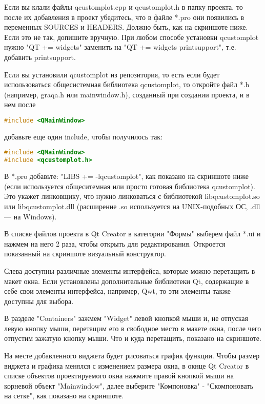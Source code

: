 Если вы клали файлы qcustomplot.cpp и qcustomplot.h в папку проекта, то после их добавления в проект убедитесь, что в файле *.pro они появились в переменных SOURCES и HEADERS. Должно быть, как на скриншоте ниже. Если это не так, допишите вручную. При любом способе установки qcustomplot нужно "QT += widgets" заменить на "QT += widgets printsupport", т.е. добавить printsupport.

Если вы установили qcustomplot из репозитория, то есть если будет использоваться общесистемная библиотека qcustomplot, то откройте файл *.h (например, graqa.h или mainwindow.h), созданный при создании проекта, и в нем после
\begin{lstlisting}[language=c++]
#include <QMainWindow>
\end{lstlisting}
добавьте еще один include, чтобы получилось так:
\begin{lstlisting}[language=c++]
#include <QMainWindow>
#include <qcustomplot.h>
\end{lstlisting}
В *.pro добавьте: "LIBS += -lqcustomplot", как показано на скриншоте ниже (если используется общеситемная или просто готовая библиотека qcustomplot). Это укажет линковщику, что нужно линковаться с библиотекой libqcustomplot.so или libqcustomplot.dll (расширение .so используется на UNIX-подобных ОС, .dll — на Windows).

В списке файлов проекта в Qt Creator в категории "Формы" выберем файл *.ui и нажмем на него 2 раза, чтобы открыть для редактирования. Откроется показанный на скриншоте визуальный конструктор.

Слева доступны различные элементы интерфейса, которые можно перетащить в макет окна. Если установлены дополнительные библиотеки Qt, содержащие в себе свои элементы интерфейса, например, Qwt, то эти элементы также доступны для выбора.

В разделе "Containers" зажмем "Widget" левой кнопкой мыши и, не отпуская левую кнопку мыши, перетащим его в свободное место в макете окна, после чего отпустим зажатую кнопку мыши. Что и куда перетащить, показано на скриншоте.

На месте добавленного виджета будет рисоваться график функции. Чтобы размер виджета и графика менялся с изменением размера окна, в окнце Qt Creator в списке объектов проектируемого окна нажмите правой кнопкой мыши на корневой объект "Mainwindow", далее выберите "Компоновка" - "Скомпоновать на сетке", как показано на скриншоте.

